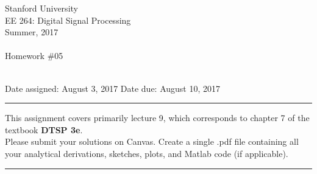 \documentclass[12pt]{report}
\begin{document}
\thispagestyle{empty}
\begin{centering}
	{\large Stanford University}\\
	{\large EE 264: Digital Signal Processing}\\
	{\large Summer, 2017} \\
	\mbox{}\\
	{\large Homework \#05}\\
	\mbox{}\\
\end{centering}
\noindent Date assigned:  August 3, 2017 \hfill
Date due: August 10, 2017\\
\noindent \rule{6.5 in}{0.5pt}
  This assignment covers primarily lecture 9, which corresponds to chapter 7 of the textbook {\bf DTSP 3e}. \\
  Please submit your solutions on Canvas. Create a single .pdf file containing all your analytical derivations, sketches, plots, and Matlab code (if applicable). \\
\noindent
\rule{6.5 in}{0.5pt}
\mbox{}\\

\end{document}
